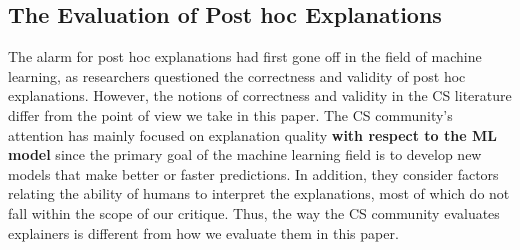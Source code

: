 \documentclass[mnsc,blindrev]{informs3}
\begin{document}
    \subsection{The Evaluation of Post hoc Explanations}
        \label{sec:cs_critique}
        The alarm for post hoc explanations had first gone off in the field of machine learning, as researchers questioned the correctness and validity of post hoc explanations. However, the notions of correctness and validity in the CS literature differ from the point of view we take in this paper. The CS community's attention has mainly focused on explanation quality \textbf{with respect to the ML model} since the primary goal of the machine learning field is to develop new models that make better or faster predictions. In addition, they consider factors relating the ability of humans to interpret the explanations, most of which do not fall within the scope of our critique. Thus, the way the CS community evaluates explainers is different from how we evaluate them in this paper.
\end{document}
